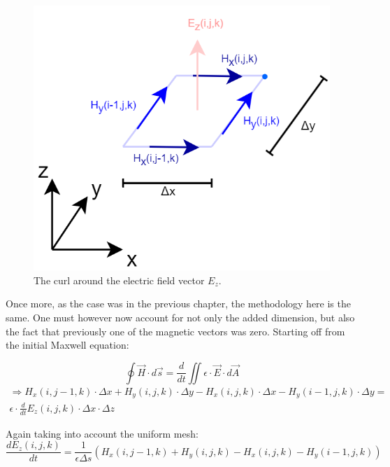 \begin{figure}[h!]
	\centering
	\includegraphics[scale=0.5]{Figures/fdtd3dEzCurl}
	\decoRule
	\caption[3D $E_z$ vector curl]{The curl around the electric field vector $E_z$.}
	\label{fig:fdtd3dEzCurl}
\end{figure}

Once more, as the case was in the previous chapter, the methodology here is the same. One must however now account for not only the added dimension, but also the fact that previously one of the magnetic vectors was zero.
Starting off from the initial Maxwell equation:

\begin{equation}
	\label{eqn:magneticIntegral}
	\oint \vec{H} \cdot d\vec{s} = \frac{d}{dt} \iint \epsilon \cdot \vec{E} \cdot d\vec{A}
\end{equation}
\begin{multline}
	\label{eqn:3dEzCurl1}
	\Rightarrow H_x(i,j-1,k) \cdot \Delta x + H_y(i,j,k) \cdot \Delta y - H_x(i,j,k) \cdot \Delta x - H_y(i-1,j,k) \cdot \Delta y =\\ \epsilon \cdot \frac{d}{dt} E_z(i,j,k) \cdot \Delta x \cdot \Delta z
\end{multline}

Again taking into account the uniform mesh:
\begin{equation}
	\label{eqn:3dEzCurl2}
	\frac{d E_z(i,j,k)}{dt} = \frac{1}{\epsilon \Delta s} (H_x(i,j-1,k) + H_y(i,j,k) - H_x(i,j,k) - H_y(i-1,j,k))
\end{equation}

